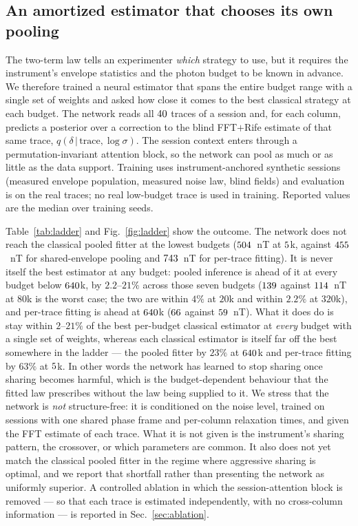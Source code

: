 \documentclass[aps,pra,twocolumn,superscriptaddress,nofootinbib]{revtex4-2}
\begin{document}
\subsection{An amortized estimator that chooses its own pooling}
\label{sec:net}

The two-term law tells an experimenter \emph{which} strategy to use, but it requires the
instrument's envelope statistics and the photon budget to be known in advance. We therefore
trained a neural estimator that spans the entire budget range with a single set of weights
and asked how close it comes to the best classical strategy at each budget. The network
reads all $40$ traces of a session and, for each column, predicts a posterior over a
correction to the blind FFT$+$Rife estimate of that same trace,
$q(\delta\,|\,\text{trace},\log\sigma)$. The session context enters through a
permutation-invariant attention block, so the network can pool as much or as little as the
data support. Training uses instrument-anchored synthetic sessions (measured envelope
population, measured noise law, blind fields) and evaluation is on the real traces; no real
low-budget trace is used in training. Reported values are the median over
\nSeedsNetSet{} training seeds.

Table~\ref{tab:ladder} and Fig.~\ref{fig:ladder} show the outcome. The network does not
reach the classical pooled fitter at the lowest budgets ($504$~nT at
$5$k, against $455$~nT for shared-envelope pooling and $743$~nT
for per-trace fitting). It is never itself the best estimator at any budget: pooled
inference is ahead of it at every budget below $640$k, by $2.2$--$21\%$ across those
seven budgets ($139$ against $114$~nT at $80$k is the worst case;
the two are within $4\%$ at $20$k and within $2.2\%$ at $320$k), and per-trace fitting is
ahead at $640$k
($66$ against $59$~nT). What
it does do is stay within $2$--$21\%$ of the best per-budget classical estimator at
\emph{every} budget with a single set of weights, whereas each classical estimator is
itself far off the best somewhere in the ladder --- the pooled fitter by $23\%$ at
$640$k and per-trace fitting by $63\%$ at $5$k. In other words the network has learned to stop sharing once
sharing becomes harmful, which is the budget-dependent behaviour that the fitted law
prescribes without the law being supplied to it. We stress that the network is \emph{not}
structure-free: it is conditioned on the noise level, trained on sessions with one shared
phase frame and per-column relaxation times, and given the FFT estimate of each trace. What
it is not given is the instrument's sharing pattern, the crossover, or which parameters are
common. It also does not yet match the classical pooled fitter in the regime where
aggressive sharing is optimal, and we report that shortfall rather than presenting the
network as uniformly superior. A controlled ablation in which the session-attention block is
removed --- so that each trace is estimated independently, with no cross-column
information --- is reported in Sec.~\ref{sec:ablation}.
\end{document}
